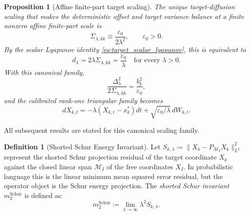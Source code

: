 \documentclass[preprint,12pt]{elsarticle}
\theoremstyle{plain}
\newtheorem{proposition}[theorem]{Proposition}
\theoremstyle{definition}
\newtheorem{definition}[theorem]{Definition}
\theoremstyle{remark}
\begin{document}
    \begin{proposition}[Affine finite-part target scaling]
        \label{prop:exact_calibration}
        The unique target-diffusion scaling that makes the deterministic offset
        and target variance balance at a finite nonzero affine finite-part scale is
        \begin{equation}
            \label{eq:exact_variance_normalization}
            \Sigma_{\lambda,kk}\equiv \frac{\varepsilon_0}{2\lambda^2},
            \qquad \varepsilon_0>0.
        \end{equation}
        By the scalar Lyapunov identity \eqref{eq:target_scalar_lyapunov}, this is equivalent to
        \begin{equation}
            \label{eq:canonical_diffusion_scaling}
            d_\lambda = 2\lambda\Sigma_{\lambda,kk}
            = \frac{\varepsilon_0}{\lambda}
            \quad \text{for every } \lambda>0.
        \end{equation}
        With this canonical family,
        \begin{equation}
            \label{eq:canonical_balanced_ratio}
            \frac{\Delta_\lambda^2}{2\Sigma_{\lambda,kk}}
            = \frac{b_k^2}{\varepsilon_0},
        \end{equation}
        and the calibrated rank-one triangular family becomes
        \begin{equation}
            \label{eq:canonical_approximating_operators}
            dX_{k,t} = -\lambda (X_{k,t} - x_k^*) dt + \sqrt{\varepsilon_0 / \lambda}\, dW_{k,t}.
        \end{equation}
    \end{proposition}

    All subsequent results are stated for this canonical scaling family.

    \begin{definition}[Shorted Schur Energy Invariant]
        \label{def:schur_invariant}
        Let $S_{k,\lambda} \coloneqq \|X_k - P_{\mathcal{M}_I} X_k\|_{L^2}^2$ represent the shorted Schur projection residual of the target coordinate $X_k$ against the closed linear span $\mathcal{M}_I$ of the free coordinates $X_I$. In probabilistic language this is the linear minimum mean squared error residual, but the operator object is the Schur energy projection. The \emph{shorted Schur invariant} $m_2^{\mathrm{Schur}}$ is defined as:
        \begin{equation}
            \label{eq:m2_schur_definition}
            m_2^{\mathrm{Schur}} \coloneqq \lim_{\lambda\to\infty} \lambda^2 S_{k,\lambda}.
        \end{equation}
    \end{definition}
\end{document}
